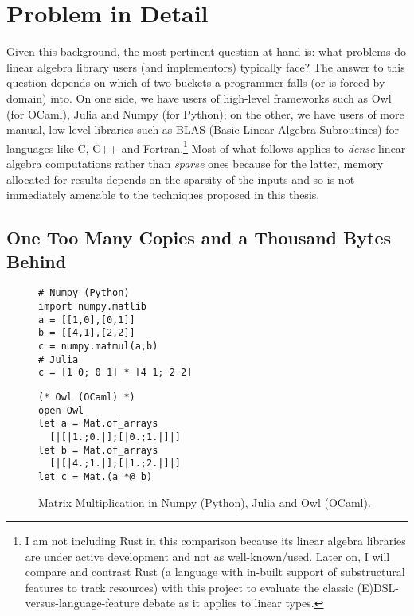 \section{Problem in Detail}

Given this background, the most pertinent question at hand is: what problems do
linear algebra library users (and implementors) typically face? The answer to
this question depends on which of two buckets a programmer falls (or is forced
by domain) into. On one side, we have users of high-level frameworks such as
Owl (for OCaml), Julia and Numpy (for Python); on the other, we have users
of more manual, low-level libraries such as BLAS (Basic Linear Algebra
Subroutines) for languages like C, C++ and Fortran.\footnote{I am not including
Rust in this comparison because its linear algebra libraries are under
active development and not as well-known/used. Later on, I will compare and
contrast Rust (a language with in-built support of substructural features
to track resources) with this project to evaluate the classic
(E)DSL-versus-language-feature debate as it applies to linear types.} Most of
what follows applies to \emph{dense} linear algebra computations rather than
\emph{sparse} ones because for the latter, memory allocated for results depends
on the sparsity of the inputs and so is not immediately amenable to the
techniques proposed in this thesis.

\subsection{One Too Many Copies and a Thousand Bytes Behind}
\begin{figure}[tp]
    \centering

    \begin{minipage}{0.45\textwidth}
    \centering
    \begin{verbatim}
# Numpy (Python)
import numpy.matlib
a = [[1,0],[0,1]]
b = [[4,1],[2,2]]
c = numpy.matmul(a,b)
# Julia
c = [1 0; 0 1] * [4 1; 2 2]
    \end{verbatim}
    \end{minipage}%
    \begin{minipage}{0.45\textwidth}
    \centering
    \begin{verbatim}
(* Owl (OCaml) *)
open Owl
let a = Mat.of_arrays
  [|[|1.;0.|];[|0.;1.|]|]
let b = Mat.of_arrays
  [|[|4.;1.|];[|1.;2.|]|]
let c = Mat.(a *@ b)
    \end{verbatim}
    \end{minipage}

    \caption{Matrix Multiplication in Numpy (Python), Julia and Owl
        (OCaml).}\label{fig:mat_mul_copies}

\end{figure}

